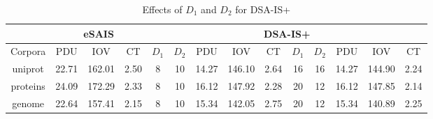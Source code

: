 \documentclass[10pt,journal,compsoc]{IEEEtran}
\begin{document}
\begin{table}[htbp]
\caption{Effects of $D_1$ and $D_2$ for DSA-IS+}
\label{tbl:effect_of_D}
\centering
\begin{tabular}{|c|c|c|c|c|c|c|c|c||c|c|c|c|c|}
	\hline
	\multicolumn{1}{|c}{} & \multicolumn{3}{|c}{eSAIS} & \multicolumn{10}{|c|}{DSA-IS+}\\\hline
	\hline
	Corpora & PDU & IOV & CT & $D_1$ & $D_2$ & PDU & IOV & CT  & $D_1$ & $D_2$ & PDU & IOV & CT\\\hline
	uniprot & 22.71 & 162.01 & 2.50 & 8 & 10 & 14.27 & 146.10 & 2.64 & 16 & 16 & 14.27 & 144.90 & 2.24 \\\hline
	proteins & 24.09 & 172.29 & 2.33 & 8 & 10 & 16.12 & 147.92 & 2.28 & 20 & 12 & 16.12 & 147.85 & 2.14 \\\hline
	genome & 22.64 & 157.41 & 2.15 & 8 & 10 & 15.34 & 142.05 & 2.75 & 20 & 12 & 15.34 & 140.89 & 2.25 \\\hline
\end{tabular}
\end{table}%
\end{document}
